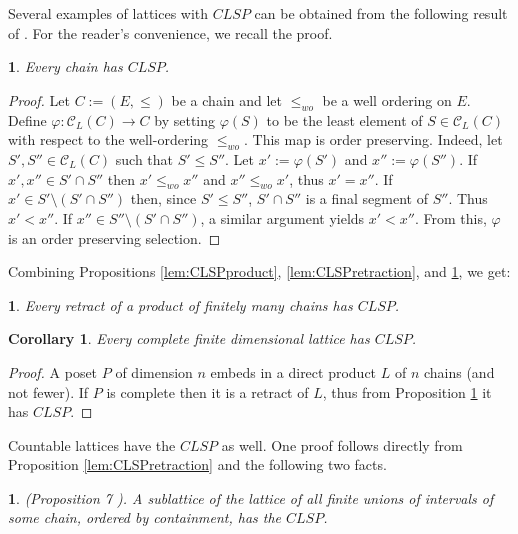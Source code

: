 \documentclass[12pt]{amsart}
\newtheorem{corollary}[definition]{{\bf Corollary}}
\newtheorem{proposition}[definition]{\noindent {\bf Proposition}}
\begin{document}
Several examples of lattices with $CLSP$ can be obtained from the
following result of \cite{D-R-S}.  For the reader's convenience, we
recall the proof.

\begin{proposition} \label{prop:CLSPchain} 
Every chain has $CLSP$. \end{proposition}

\begin{proof} 
Let $C:= (E,\leq)$ be a chain and let $\leq_{wo}$ be a well ordering
on $E$.  Define $\varphi: \mathcal{C}_{ L}(C)\rightarrow C$ by setting
$\varphi(S)$ to be the least element of $S \in \mathcal{C}_L (C)$ with
respect to the well-ordering $\leq_{wo}$. This map is order
preserving.  Indeed, let $S', S''\in \mathcal C_{L}(C)$ such that $S'
\leq S''$.  Let $x':= \varphi(S')$ and $x'':= \varphi(S'')$.  If
$x',x''\in S'\cap S''$ then $x' \leq_{wo} x''$ and $x''\leq_{wo} x'$,
thus $x'=x''$. If $x'\in S'\setminus (S'\cap S'')$ then, since $S'\leq
S''$, $S'\cap S''$ is a final segment of $S''$. Thus $x'< x''$. If
$x''\in S''\setminus (S'\cap S'')$, a similar argument yields
$x'<x''$. From this, $\varphi$ is an order preserving
selection. \end{proof}

Combining Propositions \ref{lem:CLSPproduct},
\ref{lem:CLSPretraction}, and \ref{prop:CLSPchain}, we get:

\begin{proposition}
Every retract of a product of finitely many chains has $CLSP$.
\end{proposition}

\begin{corollary}\label{prop:finitedim} 
Every complete finite dimensional lattice has $CLSP$.
\end{corollary}

\begin{proof} 
A poset $P$ of dimension $n$ embeds in a direct product $L$ of $n$
chains (and not fewer).  If $P$ is complete then it is a retract of
$L$, thus from Proposition \ref{prop:finitedim} it has $CLSP$.
\end{proof}

Countable lattices have the $CLSP$ as well.  One proof follows directly
from Proposition \ref{lem:CLSPretraction} and the following two
facts.

\begin{proposition}(Proposition 7 \cite{pou-riv84}). 
A sublattice of the lattice of all finite unions of intervals of some
chain, ordered by containment, has the $CLSP$.
\end{proposition}
\end{document}
